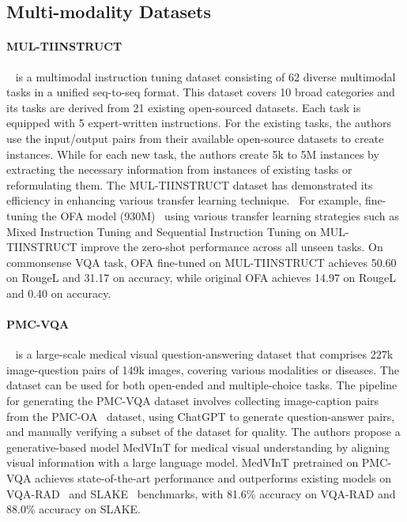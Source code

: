 \documentclass[11pt]{article}
\begin{document}
\subsection{Multi-modality Datasets}

\paragraph{MUL-TIINSTRUCT}~\citep{Xu2022MultiInstructIM} is a multimodal instruction tuning  dataset consisting of 62 diverse multimodal tasks in a unified seq-to-seq format. This dataset covers 10 broad categories and its tasks are derived from 21 existing open-sourced datasets. 
Each task is equipped with 5 expert-written instructions. For the existing tasks, the authors use the input/output pairs from their available open-source datasets to create instances. While for each new task, the authors create 5k to 5M instances by extracting the necessary information from instances of existing tasks or reformulating them. 
The MUL-TIINSTRUCT dataset has demonstrated its efficiency in enhancing various transfer learning technique. 
For example, fine-tuning the OFA model (930M)~\citep{DBLP:conf/icml/WangYMLBLMZZY22} 
using various transfer learning strategies such as Mixed Instruction Tuning and Sequential Instruction Tuning 
on  MUL-TIINSTRUCT improve the zero-shot performance  across all unseen tasks. On commonsense VQA task, OFA fine-tuned on MUL-TIINSTRUCT achieves 50.60 on RougeL and 31.17 on accuracy, while original OFA achieves 14.97 on RougeL and 0.40 on accuracy.

\paragraph{PMC-VQA}~\citep{Zhang2023PMCVQAVI} is a large-scale medical visual question-answering dataset that comprises 227k image-question pairs of 149k images, covering various modalities or diseases. The dataset can be used for both open-ended and multiple-choice tasks. The pipeline for generating the PMC-VQA dataset involves collecting image-caption pairs from the PMC-OA~\citep{lin2023pmc} dataset, using ChatGPT to generate question-answer pairs, and manually verifying a subset of the dataset for quality. The authors propose a generative-based model MedVInT for medical visual understanding by aligning visual information with a large language model. MedVInT pretrained on PMC-VQA achieves state-of-the-art performance and outperforms existing models on VQA-RAD~\citep{lau2018dataset} and SLAKE~\citep{liu2021slake} benchmarks, with 81.6\% accuracy on VQA-RAD and 88.0\% accuracy on SLAKE.
\end{document}

